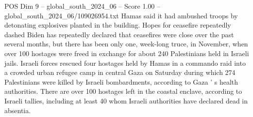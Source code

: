 \begin{textsample}{POS Dim 9 – global\_south\_2024\_06 – Score 1.00 – global\_south\_2024\_06/109026954.txt}
Hamas said it had ambushed troops by detonating explosives planted in the building.
Hopes for ceasefire repeatedly dashed Biden has repeatedly declared that ceasefires were close over the past several months, but there has been only one, week-long truce, in November, when over 100 hostages were freed in exchange for about 240 Palestinians held in Israeli jails.
Israeli forces rescued four hostages held by Hamas in a commando raid into a crowded urban refugee camp in central Gaza on Saturday during which 274 Palestinians were killed by Israeli bombardments, according to Gaza ' s health authorities.
There are over 100 hostages left in the coastal enclave, according to Israeli tallies, including at least 40 whom Israeli authorities have declared dead in absentia.

\end{textsample}
